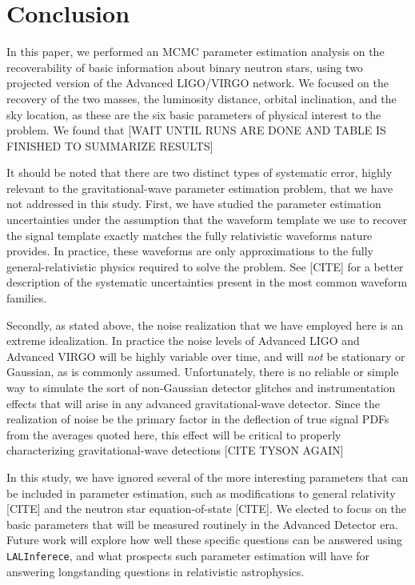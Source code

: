 \documentclass[11pt,a4paper]{emulateapj}
\newcommand{\carl}[1]{{\color{red}  #1}}
\begin{document}
\section{Conclusion}
\label{conclusionSection}

In this paper, we performed an MCMC parameter estimation analysis on the recoverability of basic information about binary neutron stars, using two projected version of the Advanced LIGO/VIRGO network.  We focused on the recovery of the two masses, the luminosity distance, orbital inclination, and the sky location, as these are the six basic parameters of physical interest to the problem.  We found that \carl{[WAIT UNTIL RUNS ARE DONE AND TABLE IS FINISHED TO SUMMARIZE RESULTS]}

It should be noted that there are two distinct types of systematic error, highly relevant to the gravitational-wave parameter estimation problem, that we have not addressed in this study.  First, we have studied the parameter estimation uncertainties under the assumption that the waveform template we use to recover the signal template exactly matches the fully relativistic waveforms nature provides.  In practice, these waveforms are only approximations to the fully general-relativistic physics required to solve the problem.  See \carl{[CITE]} for a better description of the systematic uncertainties present in the most common waveform families.

Secondly, as stated above, the noise realization that we have employed here is an extreme idealization.  In practice the noise levels of Advanced LIGO and Advanced VIRGO will be highly variable over time, and will \emph{not} be stationary or Gaussian, as is commonly assumed.  Unfortunately, there is no reliable or simple way to simulate the sort of non-Gaussian detector glitches and instrumentation effects that will arise in any advanced gravitational-wave detector.  Since the realization of noise be the primary factor in the deflection of true signal PDFs from the averages quoted here, this effect will be critical to properly characterizing gravitational-wave detections \carl{[CITE TYSON AGAIN]}

In this study, we have ignored several of the more interesting parameters that can be included in parameter estimation, such as modifications to general relativity \carl{[CITE]} and the neutron star equation-of-state \carl{[CITE]}.  We elected to focus on the basic parameters that will be measured routinely in the Advanced Detector era.  Future work will explore how well these specific questions can be answered using \texttt{LALInferece}, and what prospects such parameter estimation will have for answering longstanding questions in relativistic astrophysics.


{}
\end{document}
